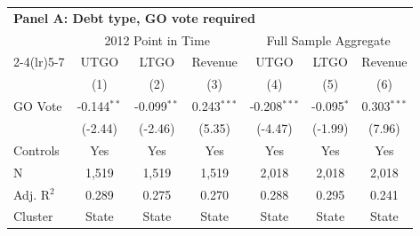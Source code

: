 \begingroup
\small
\centering
\begin{tabular*}{\textwidth}{@{\extracolsep{\fill}}lcccccc}
\multicolumn{7}{l}{\textbf{Panel A: Debt type, GO vote required}}\\

\addlinespace
   \toprule
     & \multicolumn{3}{c}{2012 Point in Time} & \multicolumn{3}{c}{Full Sample Aggregate} \\ 
   \cmidrule(lr){2-4}\cmidrule(lr){5-7}
                  & UTGO          & LTGO          & Revenue       & UTGO           & LTGO         & Revenue \\   
                  & (1)           & (2)           & (3)           & (4)            & (5)          & (6)\\  
   \midrule 
   GO Vote        & -0.144$^{**}$ & -0.099$^{**}$ & 0.243$^{***}$ & -0.208$^{***}$ & -0.095$^{*}$ & 0.303$^{***}$\\   
                  & (-2.44)      & (-2.46)      & (5.35)       & (-4.47)       & (-1.99)     & (7.96)\\   
   \hline
   Controls       & Yes & Yes & Yes & Yes & Yes & Yes\\
   N   & 1,519         & 1,519         & 1,519         & 2,018          & 2,018        & 2,018\\  
   Adj. R$^2$ & 0.289         & 0.275         & 0.270         & 0.288          & 0.295        & 0.241\\  
   Cluster              & State & State & State & State & State & State\\  
   \bottomrule
\end{tabular*}
\par\endgroup
